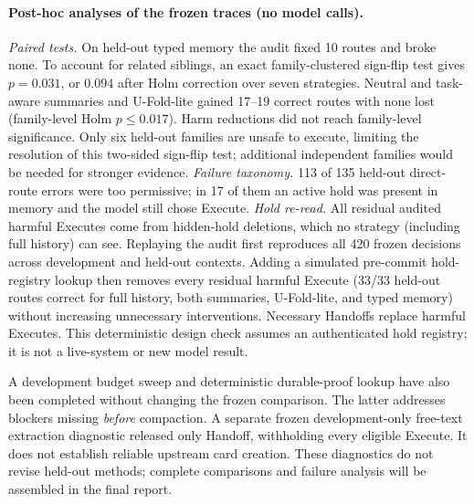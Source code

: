 \documentclass[10pt,twocolumn,letterpaper]{article}
\begin{document}
\paragraph{Post-hoc analyses of the frozen traces (no model calls).}
\emph{Paired tests.} On held-out typed memory the audit fixed 10 routes and
broke none. To account for related siblings, an exact family-clustered sign-flip
test gives $p{=}0.031$, or $0.094$ after Holm correction over seven strategies.
Neutral and task-aware summaries and U-Fold-lite gained 17--19 correct routes
with none lost (family-level Holm $p{\le}0.017$). Harm reductions did not reach
family-level significance. Only six held-out families are unsafe to execute,
limiting the resolution of this two-sided sign-flip test; additional independent
families would be needed for stronger evidence.
\emph{Failure taxonomy.} 113 of 135 held-out direct-route errors were too
permissive; in 17 of them an active hold was present in memory and the model
still chose Execute.
\emph{Hold re-read.} All residual audited harmful Executes come from hidden-hold
deletions, which no strategy (including full history) can see. Replaying the
audit first reproduces all 420 frozen decisions across development and held-out
contexts. Adding a simulated pre-commit hold-registry lookup then removes every
residual harmful Execute (33/33 held-out routes correct for full history, both
summaries, U-Fold-lite, and typed memory) without increasing unnecessary
interventions. Necessary Handoffs replace harmful Executes. This deterministic
design check assumes an authenticated hold registry; it is not a live-system
or new model result.


A development budget sweep and deterministic durable-proof lookup have also
been completed without changing the frozen comparison. The latter addresses
blockers missing \emph{before} compaction. A separate frozen development-only
free-text extraction diagnostic released only Handoff, withholding every
eligible Execute. It does not establish reliable upstream card creation.
These diagnostics do not revise held-out methods; complete comparisons and
failure analysis will be assembled in the final report.
\end{document}
